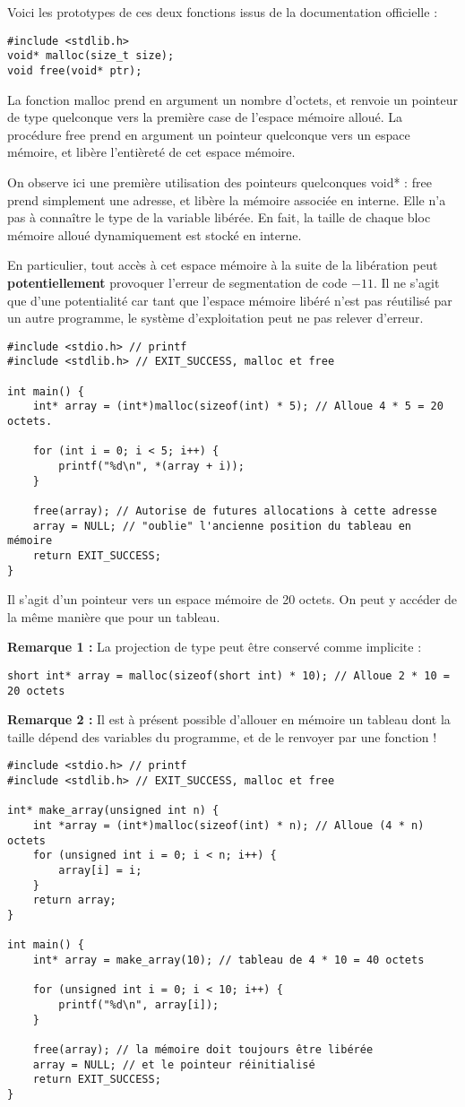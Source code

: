 \documentclass[../../../main.tex]{subfiles}
\begin{document}
Voici les prototypes de ces deux fonctions issus de la documentation officielle :
\begin{verbatim}
#include <stdlib.h>
void* malloc(size_t size);
void free(void* ptr);
\end{verbatim}
La fonction \textsf{malloc} prend en argument un nombre d'octets, et renvoie un pointeur de type quelconque vers la première case de l'espace mémoire alloué. La procédure \textsf{free} prend en argument un pointeur quelconque vers un espace mémoire, et libère l'entièreté de cet espace mémoire.
 
On observe ici une première utilisation des pointeurs quelconques \textsf{void*} : \textsf{free} prend simplement une adresse, et libère la mémoire associée en interne. Elle n'a pas à connaître le type de la variable libérée. En fait, la taille de chaque bloc mémoire alloué dynamiquement est stocké en interne.

En particulier, tout accès à cet espace mémoire à la suite de la libération peut \textbf{potentiellement} provoquer l'erreur de segmentation de code $-11$. Il ne s'agit que d'une potentialité car tant que l'espace mémoire libéré n'est pas réutilisé par un autre programme, le système d'exploitation peut ne pas relever d'erreur.
\begin{verbatim}
#include <stdio.h> // printf
#include <stdlib.h> // EXIT_SUCCESS, malloc et free

int main() {
	int* array = (int*)malloc(sizeof(int) * 5); // Alloue 4 * 5 = 20 octets.

	for (int i = 0; i < 5; i++) {
		printf("%d\n", *(array + i));
	}

	free(array); // Autorise de futures allocations à cette adresse
	array = NULL; // "oublie" l'ancienne position du tableau en mémoire
	return EXIT_SUCCESS;
}
\end{verbatim}
Il s'agit d'un pointeur vers un espace mémoire de 20 octets. On peut y accéder de la même manière que pour un tableau.
 
\textbf{Remarque 1 :} La projection de type peut être conservé comme implicite :
\begin{verbatim}
short int* array = malloc(sizeof(short int) * 10); // Alloue 2 * 10 = 20 octets
\end{verbatim}
\textbf{Remarque 2 :} Il est à présent possible d'allouer en mémoire un tableau dont la taille dépend des variables du programme, et de le renvoyer par une fonction !
\begin{verbatim}
#include <stdio.h> // printf
#include <stdlib.h> // EXIT_SUCCESS, malloc et free

int* make_array(unsigned int n) {
	int *array = (int*)malloc(sizeof(int) * n); // Alloue (4 * n) octets
	for (unsigned int i = 0; i < n; i++) {
		array[i] = i;
	}
	return array;
}

int main() {
	int* array = make_array(10); //	tableau de 4 * 10 = 40 octets

	for (unsigned int i = 0; i < 10; i++) {
		printf("%d\n", array[i]);
	}

	free(array); // la mémoire doit toujours être libérée
	array = NULL; // et le pointeur réinitialisé
	return EXIT_SUCCESS;
}
\end{verbatim}
\end{document}
